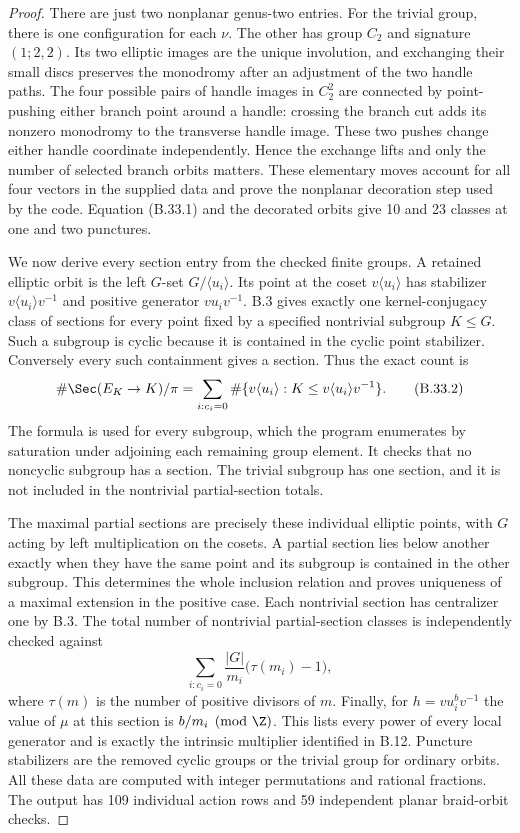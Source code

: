 \begin{proof}
There are just two nonplanar genus-two entries. For the trivial
group, there is one configuration for each $\nu$. The other
has group $C_2$ and signature $(1;2,2)$. Its two elliptic
images are the unique involution, and exchanging their small
discs preserves the monodromy after an adjustment of the two
handle paths. The four possible pairs of handle images in
$C_2^2$ are connected by point-pushing either branch point
around a handle: crossing the branch cut adds its nonzero
monodromy to the transverse handle image. These two pushes
change either handle coordinate independently. Hence the
exchange lifts and only the number of selected branch orbits
matters. These elementary moves account for all four vectors
in the supplied data and prove the nonplanar decoration step
used by the code. Equation (B.33.1) and the decorated orbits
give 10 and 23 classes at one and two punctures.

We now derive every section entry from the checked finite
groups. A retained elliptic orbit is the left $G$-set
$G/\langle u_i\rangle$. Its point at the coset
$v\langle u_i\rangle$ has stabilizer
$v\langle u_i\rangle v^{-1}$ and positive generator
$v u_i v^{-1}$. B.3 gives exactly one kernel-conjugacy class
of sections for every point fixed by a specified nontrivial
subgroup $K\leq G$. Such a subgroup is cyclic because it is
contained in the cyclic point stabilizer. Conversely every
such containment gives a section. Thus the exact count is
\[
 \#\Sec(E_K\to K)/\pi
  =\sum_{i:c_i=0}
       \#\{v\langle u_i\rangle:
                    K\leq v\langle u_i\rangle v^{-1}\}.
                                                               \tag{B.33.2}
\]
The formula is used for every subgroup, which the program
enumerates by saturation under adjoining each remaining group
element. It checks that no noncyclic subgroup has a section.
The trivial subgroup has one section, and it is not included
in the nontrivial partial-section totals.

The maximal partial sections are precisely these individual
elliptic points, with $G$ acting by left multiplication on the
cosets. A partial section lies below another exactly when
they have the same point and its subgroup is contained in the
other subgroup. This determines the whole inclusion relation
and proves uniqueness of a maximal extension in the positive
case. Each nontrivial section has centralizer one by B.3.
The total number of nontrivial partial-section classes is
independently checked against
\[
             \sum_{i:c_i=0}\frac{|G|}{m_i}\bigl(\tau(m_i)-1\bigr),
\]
where $\tau(m)$ is the number of positive divisors of $m$.
Finally, for $h=v u_i^b v^{-1}$ the value of $\mu$ at this
section is $b/m_i\pmod\Z$. This lists every power of every
local generator and is exactly the intrinsic multiplier
identified in B.12. Puncture stabilizers are the removed
cyclic groups or the trivial group for ordinary orbits.
All these data are computed with integer permutations and
rational fractions. The output has 109 individual action
rows and 59 independent planar braid-orbit checks.
\end{proof}
